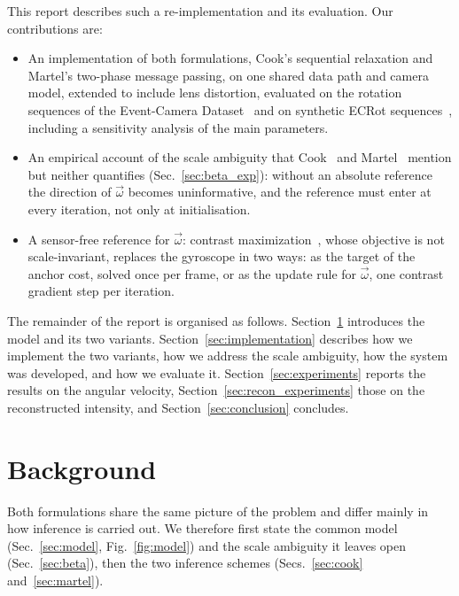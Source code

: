 \documentclass[journal]{IEEEtran}
\newcommand{\wvec}{\vec{\omega}}
\begin{document}
This report describes such a re-implementation and its evaluation. Our contributions are:
    \begin{itemize}
\item An implementation of both formulations, Cook's sequential relaxation and Martel's two-phase message passing, on one shared data path and camera model, extended to include lens distortion, evaluated on the rotation sequences of the Event-Camera Dataset~\cite{mueggler2017} and on synthetic ECRot sequences~\cite{guo2024cmaxslam}, including a sensitivity analysis of the main parameters.
\item An empirical account of the scale ambiguity that Cook~\cite{cook2011} and Martel~\cite{martel2019thesis} mention but neither quantifies (Sec.~\ref{sec:beta_exp}): without an absolute reference the direction of $\wvec$ becomes uninformative, and the reference must enter at every iteration, not only at initialisation.
\item A sensor-free reference for $\wvec$: contrast maximization~\cite{gallego2018cmax}, whose objective is not scale-invariant, replaces the gyroscope in two ways: as the target of the anchor cost, solved once per frame, or as the update rule for $\wvec$, one contrast gradient step per iteration.
\end{itemize}

The remainder of the report is organised as follows. Section~\ref{sec:background} introduces the model and its two variants. Section~\ref{sec:implementation} describes how we implement the two variants, how we address the scale ambiguity, how the system was developed, and how we evaluate it. Section~\ref{sec:experiments} reports the results on the angular velocity, Section~\ref{sec:recon_experiments} those on the reconstructed intensity, and Section~\ref{sec:conclusion} concludes.


\section{Background}
\label{sec:background}

Both formulations share the same picture of the problem and differ mainly in how inference is carried out. We therefore first state the common model (Sec.~\ref{sec:model}, Fig.~\ref{fig:model}) and the scale ambiguity it leaves open (Sec.~\ref{sec:beta}), then the two inference schemes (Secs.~\ref{sec:cook} and~\ref{sec:martel}).
\end{document}
